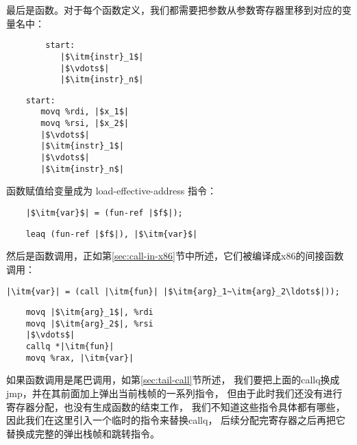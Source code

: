 最后是函数。对于每个函数定义，我们都需要把参数从参数寄存器里移到对应的变量名中：
\begin{transformation}
\begin{lstlisting}
        start:
           |$\itm{instr}_1$|
           |$\vdots$|
           |$\itm{instr}_n$|
\end{lstlisting}
\compilesto
\begin{lstlisting}
    start:
       movq %rdi, |$x_1$|
       movq %rsi, |$x_2$|
       |$\vdots$|
       |$\itm{instr}_1$|
       |$\vdots$|
       |$\itm{instr}_n$|
\end{lstlisting}
\end{transformation}

函数赋值给变量成为 load-effective-address 指令：
\begin{transformation}
\begin{lstlisting}
    |$\itm{var}$| = (fun-ref |$f$|);
\end{lstlisting}
\compilesto
\begin{lstlisting}
    leaq (fun-ref |$f$|), |$\itm{var}$|
\end{lstlisting}
\end{transformation}

然后是函数调用，正如第\ref{sec:call-in-x86}节中所述，它们被编译成x86的间接函数调用：
\begin{transformation}
\begin{lstlisting}
|\itm{var}| = (call |\itm{fun}| |$\itm{arg}_1~\itm{arg}_2\ldots$|));
\end{lstlisting}
\compilesto
\begin{lstlisting}
    movq |$\itm{arg}_1$|, %rdi
    movq |$\itm{arg}_2$|, %rsi
    |$\vdots$|
    callq *|\itm{fun}|
    movq %rax, |\itm{var}|
\end{lstlisting}
\end{transformation}

如果函数调用是尾巴调用，如第\ref{sec:tail-call}节所述，
我们要把上面的callq换成jmp，并在其前面加上弹出当前栈帧的一系列指令，
但由于此时我们还没有进行寄存器分配，也没有生成函数的结束工作，
我们不知道这些指令具体都有哪些，因此我们在这里引入一个临时的指令来替换callq，
后续分配完寄存器之后再把它替换成完整的弹出栈帧和跳转指令。


